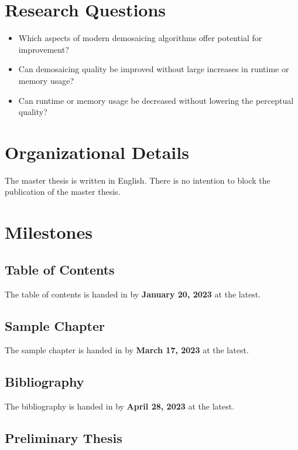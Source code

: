 \documentclass[english,notitlepage,smartquotes]{hgbreport}
\begin{document}
\section{Research Questions}

\begin{itemize}
	\item Which aspects of modern demosaicing algorithms offer potential for improvement?
	\item Can demosaicing quality be improved without large increases in runtime or memory usage?
	\item Can runtime or memory usage be decreased without lowering the perceptual quality?
\end{itemize}


\section{Organizational Details}

The master thesis is written in English.
There is no intention to block the publication of the master thesis.

\section{Milestones}

\subsection{Table of Contents}

The table of contents is handed in by \textbf{January 20, 2023} at the latest.

\subsection{Sample Chapter}

The sample chapter is handed in by \textbf{March 17, 2023} at the latest.

\subsection{Bibliography}

The bibliography is handed in by \textbf{April 28, 2023} at the latest.

\subsection{Preliminary Thesis}
\end{document}
